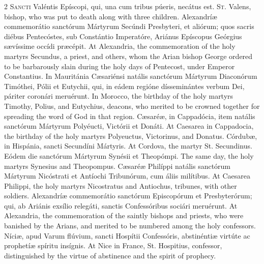 \begin{paracol}{2}
\lettrine[lines=2]{S}{ancti} Valéntis 
 Epíscopi, qui, una cum tribus púeris, necátus est.
\switchcolumn
{}
\lettrine[lines=2]{S}{t.} Valens, bishop, who was put to 
 death along with three children.
\switchcolumn*
{}
Alexandríæ 
 commemorátio sanctórum Mártyrum Secúndi Presbyteri, et aliórum; quos sacris 
 diébus Pentecóstes, sub Constántio Imperatóre, Ariánus Epíscopus Geórgius 
 sævíssime occídi præcépit.
\switchcolumn
{}
At Alexandria, the commemoration of 
 the holy martyrs Secundus, a priest, and others, whom the Arian bishop 
 George ordered to be barbarously slain during the holy days of Pentecost, 
 under Emperor Constantius.
\switchcolumn*
{}
In Mauritánia 
 Cæsariénsi natális sanctórum Mártyrum Diaconórum Timóthei, Pólii et Eutychii, 
 qui, in eádem regióne dísseminántes verbum Dei, páriter coronári meruérunt.
\switchcolumn
{}
In Morocco, the birthday of the 
 holy martyrs Timothy, Polius, and Eutychius, deacons, who merited to be 
 crowned together for spreading the word of God in that region.
\switchcolumn*
{}
Cæsaréæ, in Cappadócia, 
 item natális sanctórum Mártyrum Polyéucti, Victórii et Donáti.
\switchcolumn
{}
At Caesarea in Cappadocia, the 
 birthday of the holy martyrs Polyeuctus, Victorinus, and Donatus.
\switchcolumn*
{}
Córdubæ, in Hispánia, 
 sancti Secundíni Mártyris.
\switchcolumn
{}
At Cordova, the martyr St. 
 Secundinus.
\switchcolumn*
{}
Eódem die sanctórum 
 Mártyrum Synésii et Theopómpi.
\switchcolumn
{}
The same day, the holy martyrs 
 Synesius and Theopompus.
\switchcolumn*
{}
Cæsaréæ Philíppi 
 natális sanctórum Mártyrum Nicóstrati et Antíochi Tribunórum, cum áliis 
 milítibus.
\switchcolumn
{}
At Caesarea Philippi, the holy 
 martyrs Nicostratus and Antiochus, tribunes, with other soldiers.
\switchcolumn*
{}
Alexandríæ 
 commemorátio sanctórum Episcopórum et Presbyterórum; qui, ab Ariánis exsílio 
 relegáti, sanctis Confessóribus sociári meruérunt.
\switchcolumn
{}
At Alexandria, the commemoration of 
 the saintly bishops and priests, who were banished by the Arians, and 
 merited to be numbered among the holy confessors.
\switchcolumn*
{}
Níciæ, apud Varum 
 flúvium, sancti Hospítii Confessóris, abstinéntiæ virtúte ac prophetíæ 
 spíritu insígnis.
\switchcolumn
{}
At Nice in France, St. Hospitius, 
 confessor, distinguished by the virtue of abstinence and the spirit of 
 prophecy.
\switchcolumn*
{}
\end{paracol}


